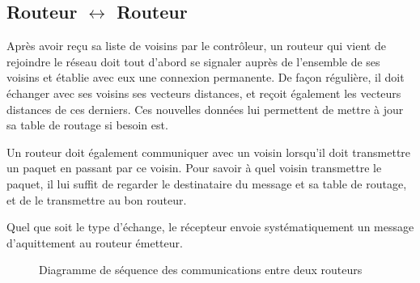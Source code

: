 \documentclass[a4paper,11pt]{article}
\begin{document}
\subsection{Routeur $\leftrightarrow$ Routeur}

Après avoir reçu sa liste de voisins par le contrôleur, un routeur qui vient de rejoindre le réseau doit tout d'abord se signaler auprès de l'ensemble de ses voisins et établie avec eux une connexion permanente. De façon régulière, il doit échanger avec ses voisins ses vecteurs distances, et reçoit également les vecteurs distances de ces derniers. Ces nouvelles données lui permettent de mettre à jour sa table de routage si besoin est.

Un routeur doit également communiquer avec un voisin lorsqu'il doit transmettre un paquet en passant par ce voisin. Pour savoir à quel voisin transmettre le paquet, il lui suffit de regarder le destinataire du message et sa table de routage, et de le transmettre au bon routeur.

Quel que soit le type d'échange, le récepteur envoie systématiquement un message d'aquittement au routeur émetteur.

\begin{figure}[H]
\begin{center}
\caption{Diagramme de séquence des communications entre deux routeurs}
\end{center}
\end{figure}
\end{document}
